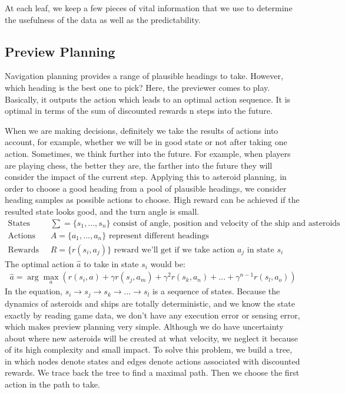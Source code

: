 \documentclass[10pt,draft,conference]{IEEEtran}
\begin{document}
At each leaf, we keep a few pieces of vital information that we use to determine the usefulness of the data as well as the predictability.  

\subsection{Preview Planning}
Navigation planning provides a range of plausible headings to take. However, which heading is the best one to pick? Here, the previewer comes to play. Basically, it outputs the action which leads to an optimal action sequence. It is optimal in terms of the sum of discounted rewards n steps into the future.

When we are making decisions, definitely we take the results of actions into account, for example, whether we will be in good state or not after taking one action. Sometimes, we think further into the future. For example, when players are playing chess, the better they are, the farther into the future they will consider the impact of the current step. Applying this to asteroid planning, in order to choose a good heading from a pool of plausible headings, we consider heading samples as possible actions to choose. High reward can be achieved if the resulted state looks good, and the turn angle is small. 
\begin{equation} \nonumber
\begin{split}
\text{States\ \ \ \ }\ &\sum = \{s_1,..., s_n\}  \text{\ \ \ \ consist of angle, position and velocity of the ship and asteroids} \\
\text{Actions\ \ \ \ }\; &A = \{a_1,..., a_n\} \text{\ \ \ \ \ \ represent different headings} \\
\text{Rewards\ \ \ \ }\; &R = \{r(s_i, a_j)\} \text{\ \ \ \ \ \ \ reward we'll get if we take action $a_j$ in state $s_i$}
\end{split}
\end{equation}
The optimal action $\hat{a}$ to take in state $s_i$ would be:
\begin{equation} \nonumber
\begin{split}
\hat{a} = \arg\max_{a} \left ( r(s_i, a) + \gamma r(s_j, a_m) + \gamma^2 r(s_k, a_n) + ... + \gamma^{n-1} r(s_l, a_o) \right ) 
\end{split}
\end{equation}
In the equation, $s_i \rightarrow s_j \rightarrow s_k \rightarrow ... \rightarrow  s_l$ is a sequence of states.
Because the dynamics of asteroids and ships are totally deterministic, and we know the state exactly by reading game data, we don't have any execution error or sensing error, which makes preview planning very simple. Although we do have uncertainty about where new asteroids will be created at what velocity, we neglect it because of its high complexity and small impact. To solve this problem, we build a tree, in which nodes denote states and edges denote actions associated with discounted rewards. We trace back the tree to find a maximal path. Then we choose the first action in the path to take. 
\end{document}
